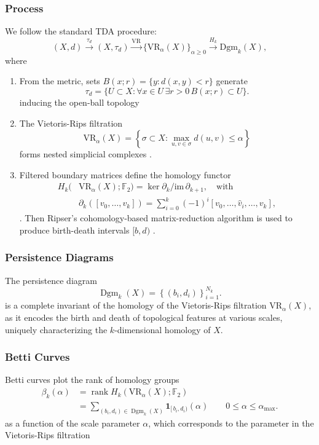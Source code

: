 \documentclass[fleqn,10pt]{SelfArx}
\begin{document}
\subsubsection*{Process}
We follow the standard TDA procedure:
\[
(X,d)\xrightarrow{\tau_d}(X,\tau_d)
\xrightarrow{\mathrm{VR}}\{\mathrm{VR}_\alpha(X)\}_{\alpha\ge0}
\xrightarrow{H_k}\mathrm{Dgm}_k(X),
\]
where
\begin{enumerate}[leftmargin=*,nosep]
  \item From the metric, sets $B(x;r)=\{y:d(x,y)<r\}$ generate
  \[
    \tau_d=\{U\subset X:\forall x\in U\,\exists r>0\,B(x;r)\subset U\}.
  \]
  inducing the open-ball topology \cite{viro2008elementary,edelsbrunner2014short}
  \item The Vietoris-Rips filtration
  $$
  \mathrm{VR}_\alpha(X)=\left\{\sigma \subset X: \max _{u, v \in \sigma} d(u, v) \leq \alpha\right\}
  $$
  forms nested simplicial complexes \cite{zomorodian2005topology}.
  \item Filtered  boundary matrices define the homology functor
  \begin{align*}
  H_k(&\mathrm{VR}_\alpha(X);\mathbb{F}_2)=\ker\partial_k/\mathrm{im}\,\partial_{k+1},\quad\text{with}\\
  &\partial_k([v_0,\dots,v_k])=\sum_{i=0}^k(-1)^i[v_0,\dots,\widehat v_i,\dots,v_k],
  \end{align*}
  \cite{edelsbrunner2009computational,edelsbrunner2014short}. Then Ripser’s cohomology‐based matrix-reduction algorithm is used to produce birth-death intervals $[b, d)$ \cite{bauer2021ripser}.
\end{enumerate}
\subsubsection*{Persistence Diagrams}
The persistence diagram 
$$
\operatorname{Dgm}_k(X)=\left\{\left(b_i, d_i\right)\right\}_{i=1}^{N_k}.
$$
is a complete invariant of the homology of the Vietoris-Rips filtration $\mathrm{VR}_\alpha(X)$, as it encodes the birth and death of topological features at various scales, uniquely characterizing the $k$-dimensional homology of $X$.
\subsubsection*{Betti Curves}
Betti curves plot the rank of homology groups
\begin{align*}
	\beta_k(\alpha)&=\operatorname{rank}H_k(\mathrm{VR}_\alpha(X);\mathbb{F}_2)\\
	&=\sum_{(b_i,d_i)\in\operatorname{Dgm}_k(X)}\!\mathbf 1_{[\,b_i,d_i)}(\alpha)\qquad 0\le\alpha\le\alpha_{\max}.
\end{align*}
as a function of the scale parameter $\alpha$, which corresponds to the parameter in the Vietoris-Rips filtration
\end{document}

